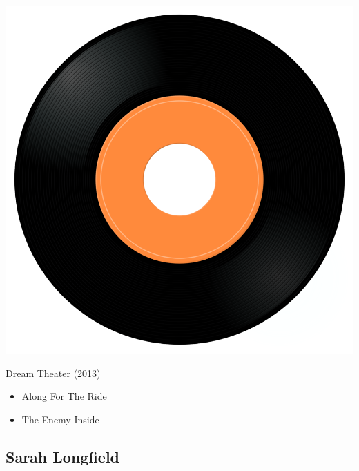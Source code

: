 \begin{minipage}[t]{0.25\textwidth}
\captionsetup{type=figure}
\includegraphics[width=\textwidth]{Images/cover.png}
\caption*{Dream Theater (2013)}
\end{minipage}
\begin{minipage}[t]{0.25\textwidth}\vspace{0pt}
\begin{itemize}[nosep,leftmargin=1em,labelwidth=*,align=left]
	\setlength{\itemsep}{0pt}
	\item Along For The Ride
	\item The Enemy Inside
\end{itemize}
\end{minipage}

\subsection{Sarah Longfield}

